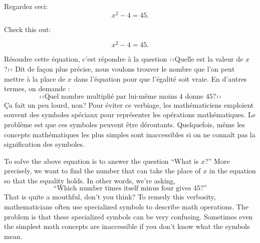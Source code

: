\begin{paracol}{2}

	\begin{leftcolumn*}

		\begin{otherlanguage}{french}
	Regardez ceci:
	\[
	 	x^2-4=45.
	\]
		\end{otherlanguage}

	\end{leftcolumn*}



	\begin{rightcolumn}

	Check this  out:

	\[
	 	x^2-4=45.
	\]

	\end{rightcolumn}

\end{paracol}


\begin{paracol}{2}

	\begin{leftcolumn*}

		\begin{otherlanguage}{french}
	Résoudre cette équation, c'est répondre à la question ‹‹Quelle est la valeur de $x$?››
	Dit de façon plus précise,
	nous voulons trouver le nombre que l'on peut mettre à la place de $x$ dans l'équation pour que l'égalité soit vraie. 
	En d'autres termes, on demande :
	\[
	 	\text{‹‹Quel nombre multiplié par lui-même moins 4 donne 45?››}
	\]
	Ça fait un peu lourd, non? 
	Pour éviter ce verbiage,
	les mathématiciens emploient souvent des symboles spéciaux pour représenter les opérations mathématiques.
	Le problème est que ces symboles peuvent être déroutants.
	Quelquefois, même les concepts mathématiques les plus simples sont inaccessibles si on ne connaît pas la signification des symboles.
	

		\end{otherlanguage}

	\end{leftcolumn*}



	\begin{rightcolumn}

	To solve the above equation is to answer
	the question ``What is $x$?''
	More precisely, we want to find the number that can take the 
	place of $x$ in the equation so that the equality holds.
	In other words, we're asking,
	\[
	  \text{``Which number times itself minus four gives 45?''}
	\]
	That is quite a mouthful, don't you think? 
	To remedy this verbosity, mathematicians often use specialized symbols to describe math operations.
	The problem is that these specialized symbols can be very confusing. 
	Sometimes even the simplest math concepts are inaccessible if you don't know what the symbols mean. 



	\end{rightcolumn}

\end{paracol}

